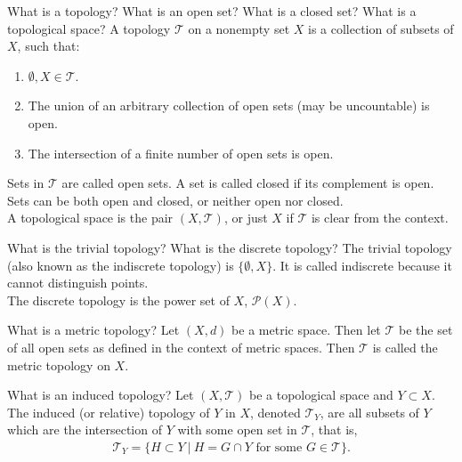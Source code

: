 \documentclass[avery5388,grid,frame]{flashcards}
\def\topo{\mathcal{T}}
\begin{document}


\begin{flashcard}
    {What is a topology?  What is an open set?  What is a closed set?  What is a topological space?}
    A topology $\topo$ on a nonempty set $X$ is a collection of subsets of $X$, such that:
    \begin{enumerate}[\ (a)]
        \item $\emptyset, X \in \topo$.
        \item The union of an arbitrary collection of open sets (may be uncountable) is open.
        \item The intersection of a finite number of open sets is open.
    \end{enumerate}
    Sets in $\topo$ are called open sets.  A set is called closed if its complement is open.  Sets can be both open and closed, or neither open nor closed. \\

    A topological space is the pair $(X,\topo)$, or just $X$ if $\topo$ is clear from the context.
\end{flashcard}

\begin{flashcard}
    {What is the trivial topology?  What is the discrete topology?}
    The trivial topology (also known as the indiscrete topology) is $\{\emptyset, X\}$.  It is called indiscrete because it cannot distinguish points. \\

    The discrete topology is the power set of $X$, $\mathcal{P}(X)$.
\end{flashcard}

\begin{flashcard}
    {What is a metric topology?}
    Let $(X,d)$ be a metric space.  Then let $\topo$ be the set of all open sets as defined in the context of metric spaces.  Then $\topo$ is called the metric topology on $X$.
\end{flashcard}

\begin{flashcard}
    {What is an induced topology?}
    Let $(X,\topo)$ be a topological space and $Y \subset X$.  The induced (or relative) topology of $Y$ in $X$, denoted $\topo_Y$, are all subsets of $Y$ which are the intersection of $Y$ with some open set in $\topo$, that is,
    \begin{align*}
        \topo_Y = \{H \subset Y\ |\ H = G \cap Y \text{ for some } G \in \topo\}.
    \end{align*}
\end{flashcard}
\end{document}

